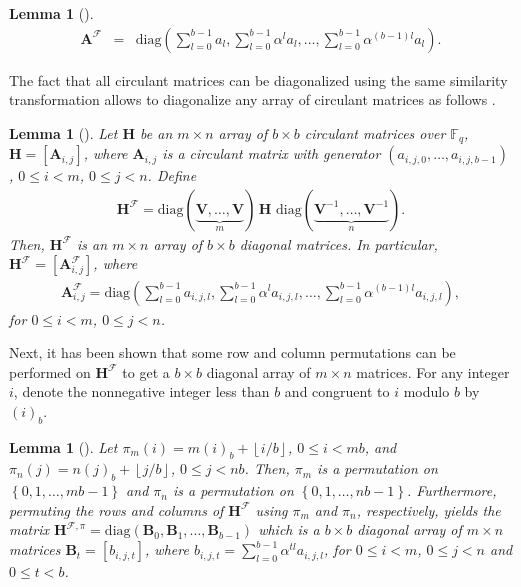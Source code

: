 \documentclass[journal,draftclsnofoot,onecolumn,12pt,twoside]{IEEEtran}
\newtheorem{lemma}[theorem]{Lemma}
\begin{document}
{\begin{lemma}[\emph{\cite[Lemma 1]{C10}}]
\begin{eqnarray}
  \mathbf{A}^{\mathcal{F}} &=& \mathrm{diag}\left(\sum_{l=0}^{b-1}a_l, \sum_{l=0}^{b-1}\alpha^l a_l,\ldots, \sum_{l=0}^{b-1}\alpha^{(b-1)l}a_l \right).
\end{eqnarray}
\end{lemma}
The fact that all circulant matrices can be diagonalized using the same similarity transformation allows to diagonalize any array of circulant matrices as follows \cite{C10}.
\begin{lemma}[\emph{\cite[Lemma 2]{C10}}]
Let $\mathbf{H}$ be an $m\times n$ array of $b\times b$ circulant matrices over $\mathbb{F}_q$, $\mathbf{H}=\left[\mathbf{A}_{i,j}\right]$, where $\mathbf{A}_{i,j}$ is a circulant matrix with generator $(a_{i,j,0},\ldots,a_{i,j,b-1})$, $0\leq i<m$, $0\leq j <n$. Define
\begin{eqnarray}
  \mathbf{H}^{\mathcal{F}} = \mathrm{diag}(\underbrace{\mathbf{V},\ldots,\mathbf{V}}_{m})\,\mathbf{H}\,\, \mathrm{diag}(\underbrace{\mathbf{V}^{-1},\ldots,\mathbf{V}^{-1}}_{n}).
\end{eqnarray}
Then, $\mathbf{H}^{\mathcal{F}}$ is an $m\times n$ array of $b\times b$ diagonal matrices. In
particular, $\mathbf{H}^{\mathcal{F}}=\left[\mathbf{A}_{i,j}^{\mathcal{F}}\right]$, where
\begin{eqnarray*}
  \mathbf{A}_{i,j}^{\mathcal{F}} = \mathrm{diag}\left(\sum_{l=0}^{b-1}a_{i,j,l}, \sum_{l=0}^{b-1}\alpha^l a_{i,j,l},\ldots, \sum_{l=0}^{b-1}\alpha^{(b-1)l}a_{i,j,l} \right),
\end{eqnarray*}
for $0\leq i<m$, $0\leq j <n$.
\end{lemma}
Next, it has been shown that some row and column permutations can be performed on $\mathbf{H}^{\mathcal{F}}$  to get a $b\times b$ diagonal array of $m\times n$ matrices. For any integer $i$, denote the nonnegative integer
less than $b$ and congruent to $i$ modulo $b$ by $(i)_b$.
\begin{lemma}[\emph{\cite[Lemma 2]{C10}}]
Let $\pi_{m}(i)=m(i)_b+\left\lfloor i/b\right\rfloor$, $0\leq i < mb$, and $\pi_{n}(j)=n(j)_b+\left\lfloor j/b\right\rfloor$, $0\leq j < nb$. Then,  $\pi_{m}$ is a permutation on $\left\{0,1,\ldots , mb-1\right\}$ and $\pi_{n}$ is a permutation on $\left\{0,1,\ldots , nb-1\right\}$. Furthermore, permuting the rows and columns of $\mathbf{H}^{\mathcal{F}}$ using $\pi_{m}$ and $\pi_{n}$, respectively, yields the  matrix $\mathbf{H}^{\mathcal{F},\pi}=\mathrm{diag}\left(\mathbf{B}_{0},\mathbf{B}_1,\ldots ,\mathbf{B}_{b-1}\right)$ which is a $b\times b$  diagonal array of $m\times n$ matrices $\mathbf{B}_t=\left[b_{i,j,t}\right]$, where $b_{i,j,t}=\sum_{l=0}^{b-1}\alpha^{tl}a_{i,j,l}$, for $0\leq i<m$, $0\leq j<n$ and $0\leq t< b$.

\end{lemma}}
\end{document}
